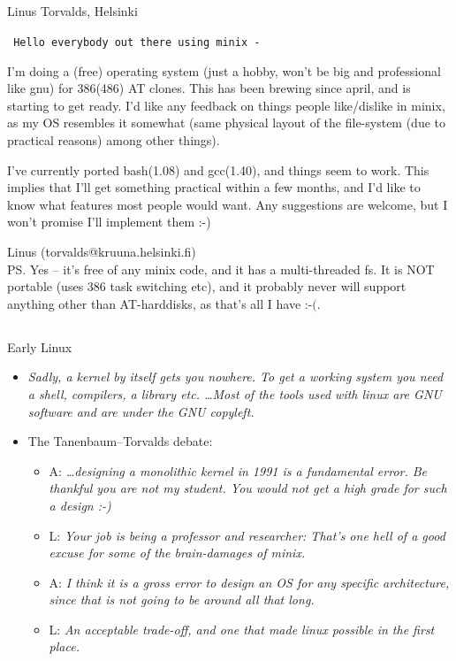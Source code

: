 \documentclass{beamer}
\begin{document}
\subsection{}
\begin{frame}{Linus Torvalds, Helsinki}

{\tt \footnotesize
    Hello everybody out there using minix -

    I'm doing a (free) operating system (just a hobby, won't be big and professional like gnu) for 386(486) AT clones. This has been brewing since april, and is starting to get ready. I'd like any feedback on things people like/dislike in minix, as my OS resembles it somewhat (same physical layout of the file-system (due to practical reasons) among other things).

    I've currently ported bash(1.08) and gcc(1.40), and things seem to work. This implies that I'll get something practical within a few months, and I'd like to know what features most people would want. Any suggestions are welcome, but I won't promise I'll implement them :-)

    Linus (torvalds@kruuna.helsinki.fi) \\
    PS. Yes -- it's free of any minix code, and it has a multi-threaded fs. It is NOT portable (uses 386 task switching etc), and it probably never will support anything other than AT-harddisks, as that's all I have :-$($.
}

\end{frame}

\subsection{}
\begin{frame}{Early Linux}
\begin{itemize}
\item {\em Sadly, a kernel by itself gets you nowhere. To get a working system you need a shell, compilers, a library etc. \dots Most of the tools used with linux are GNU software and are under the GNU copyleft.}
\item The Tanenbaum--Torvalds debate:
\begin{itemize}
\item A: {\em \dots{}designing a monolithic kernel in 1991 is
a fundamental error.  Be thankful you are not my student.  You would not
get a high grade for such a design :-) }
\item L: {\em Your job is being a professor and researcher: That's one hell of a
good excuse for some of the brain-damages of minix. }
\item A: {\em I think it is a gross error to design an OS for any specific architecture, since that is not going to be around all that long. }
\item L: {\em An acceptable trade-off, and one that made linux possible in the first place. }
\end{itemize}
\end{itemize}
\end{frame}
\end{document}
